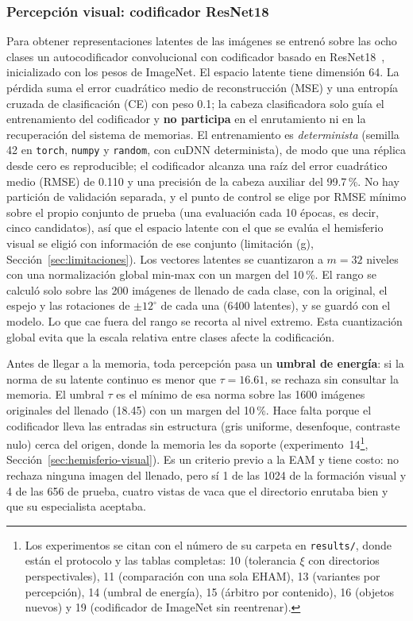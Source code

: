 \subsubsection{Percepción visual: codificador ResNet18}
\label{sec:percepcion}

Para obtener representaciones latentes de las imágenes se entrenó sobre las ocho clases
un autocodificador convolucional con codificador basado en ResNet18~\cite{he2016resnet},
inicializado con los pesos de ImageNet.
El espacio latente tiene dimensión 64.
La pérdida suma el error cuadrático medio de reconstrucción (MSE) y una entropía
cruzada de clasificación (CE) con peso 0.1; la cabeza clasificadora solo guía el
entrenamiento del codificador y \textbf{no participa} en el enrutamiento ni en la
recuperación del sistema de memorias.
El entrenamiento es \emph{determinista} (semilla 42 en \texttt{torch}, \texttt{numpy} y
\texttt{random}, con cuDNN determinista), de modo que una réplica desde cero es
reproducible; el codificador alcanza una raíz del error cuadrático medio (RMSE) de 0.110 y
una precisión de la cabeza auxiliar del 99.7\,\%.
No hay partición de validación separada, y el punto de control se elige por RMSE mínimo
sobre el propio conjunto de prueba (una evaluación cada 10 épocas, es decir, cinco
candidatos), así que el espacio latente con el que se evalúa el hemisferio visual se
eligió con información de ese conjunto (limitación (g), Sección~\ref{sec:limitaciones}).
Los vectores latentes se cuantizaron a $m = 32$ niveles con una normalización global
min-max con un margen del 10\,\%.
El rango se calculó solo sobre las 200 imágenes de llenado de cada clase, con la
original, el espejo y las rotaciones de $\pm 12^{\circ}$ de cada una (6400 latentes), y
se guardó con el modelo.
Lo que cae fuera del rango se recorta al nivel extremo.
Esta cuantización global evita que la escala relativa entre clases afecte la codificación.

Antes de llegar a la memoria, toda percepción pasa un \textbf{umbral de energía}: si
la norma de su latente continuo es menor que $\tau = 16.61$, se rechaza sin consultar
la memoria.
El umbral $\tau$ es el mínimo de esa norma sobre las 1600 imágenes originales del llenado
(18.45) con un margen del 10\,\%. Hace falta porque el codificador lleva las entradas sin
estructura (gris uniforme, desenfoque, contraste nulo) cerca del origen, donde la
memoria les da soporte (experimento~14\footnote{Los
experimentos se citan con el número de su carpeta en \texttt{results/}, donde están el
protocolo y las tablas completas: 10 (tolerancia $\xi$ con directorios
perspectivales), 11 (comparación con una sola EHAM), 13 (variantes por percepción), 14
(umbral de energía), 15 (árbitro por contenido), 16 (objetos nuevos) y 19 (codificador
de ImageNet sin reentrenar).},
Sección~\ref{sec:hemisferio-visual}).
Es un criterio previo a la EAM y tiene costo: no rechaza ninguna imagen del llenado,
pero sí 1 de las 1024 de la formación visual y 4 de las 656 de prueba, cuatro vistas de vaca
que el directorio enrutaba bien y que su especialista aceptaba.

